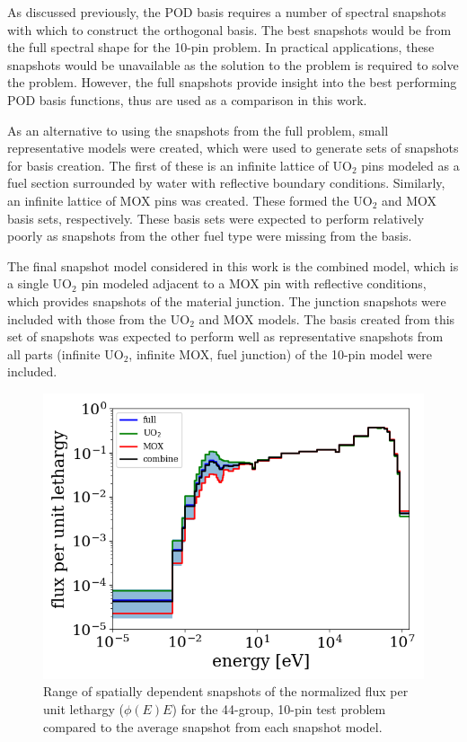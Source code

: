 \documentclass[5p,times,twocolumn,10pt]{elsarticle}
\begin{document}
    As discussed previously, the POD basis requires a number of spectral snapshots with which to construct the orthogonal basis.
    The best snapshots would be from the full spectral shape for the 10-pin problem.
    In practical applications, these snapshots would be unavailable as the solution to the problem is required to solve the problem.
    However, the full snapshots provide insight into the best performing POD basis functions, thus are used as a comparison in this work.

    As an alternative to using the snapshots from the full problem, small representative models were created, which were used to generate sets of snapshots for basis creation.
    The first of these is an infinite lattice of UO$_2$ pins modeled as a fuel section surrounded by water with reflective boundary conditions.
    Similarly, an infinite lattice of MOX pins was created.
    These formed the UO$_2$ and MOX basis sets, respectively.
    These basis sets were expected to perform relatively poorly as snapshots from the other fuel type were missing from the basis.

    The final snapshot model considered in this work is the combined model, which is a single UO$_2$ pin modeled adjacent to a MOX pin with reflective conditions, which provides snapshots of the material junction.
    The junction snapshots were included with those from the UO$_2$ and MOX models.
    The basis created from this set of snapshots was expected to perform well as representative snapshots from all parts (infinite UO$_2$, infinite MOX, fuel junction) of the 10-pin model were included.

    \begin{figure}[htb]
        \includegraphics[scale=0.55]{figures/44_snapshots}
        \caption{Range of spatially dependent snapshots of the normalized flux per unit lethargy ($\phi(E)E$) for the 44-group, 10-pin test problem compared to the average snapshot from each snapshot model.}
        \label{fig:snapshots}
    \end{figure}
\end{document}
